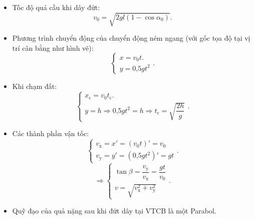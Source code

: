 \begin{itemize}
	\item Tốc độ quả cầu khi dây đứt:
	\begin{equation*}
		v_0 = \sqrt{2gl(1-\cos \alpha_0)}.
	\end{equation*}
	\item Phương trình chuyển động của chuyển động ném ngang (với gốc tọa độ tại vị trí cân bằng như hình vẽ):
	\begin{equation*}
		\begin{cases}
			x=v_0t.\\
			y=\text{0,5} gt^2
		\end{cases}.
	\end{equation*}
	\item Khi chạm đất:
	\begin{equation*}
		\begin{cases}
			x_{\text{c}}=v_0t_{\text{c}}.\\
			y=h\Rightarrow \text{0,5} gt^2=h \Rightarrow t_{\text{c}} =\sqrt {\dfrac{2h}{g}}
		\end{cases}.
	\end{equation*}
	\item Các thành phần vận tốc:
	\begin{equation*}
		\begin{cases}
			v_{\text{x}} =x' =(v_0t)'=v_0 \\
			v_{\text{y}} =y' = (\text{0,5} gt^2)'=gt
		\end{cases}.
	\end{equation*}
	\begin{equation*}
		\Rightarrow
		\begin{cases}
			\tan \beta =\dfrac{v_{\text{y}}}{v_{\text{x}}}=\dfrac{gt}{v_0}\\
			v=\sqrt{v^2_{\text{x}}+v^2_{\text{y}}}
		\end{cases}.
	\end{equation*}
	\item Quỹ đạo của quả nặng sau khi đứt dây tại VTCB là một Parabol.
\end{itemize}

